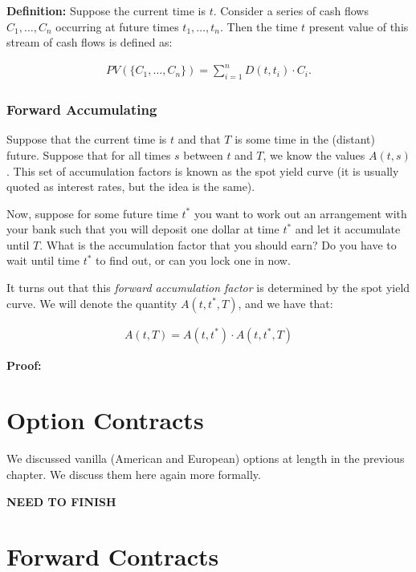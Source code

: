 \documentclass[11pt,]{krantz}
\begin{document}
\textbf{Definition:} Suppose the current time is \(t\). Consider a series of cash flows \(C_{1}, \ldots, C_{n}\) occurring at future times \(t_{1}, \ldots, t_{n}\). Then the time \(t\) present value of this stream of cash flows is defined as:

\begin{align*}
PV(\{ C_{1}, \ldots, C_{n} \}) = \sum_{i = 1}^{n} D(t, t_{i}) \cdot C_{i}.
\end{align*}

\subsubsection*{Forward Accumulating}\label{forward-accumulating}

Suppose that the current time is \(t\) and that \(T\) is some time in the (distant) future. Suppose that for all times \(s\) between \(t\) and \(T\), we know the values \(A(t,s)\). This set of accumulation factors is known as the spot yield curve (it is usually quoted as interest rates, but the idea is the same).

Now, suppose for some future time \(t^*\) you want to work out an arrangement with your bank such that you will deposit one dollar at time \(t^*\) and let it accumulate until \(T\). What is the accumulation factor that you should earn? Do you have to wait until time \(t^*\) to find out, or can you lock one in now.

It turns out that this \emph{forward accumulation factor} is determined by the spot yield curve. We will denote the quantity \(A(t, t^*, T)\), and we have that:

\begin{align*}
A(t, T) = A(t, t^*) \cdot A(t, t^*, T)
\end{align*}

\textbf{Proof:}

\section{Option Contracts}\label{option-contracts}

We discussed vanilla (American and European) options at length in the previous chapter. We discuss them here again more formally.

\textbf{NEED TO FINISH}

\section{Forward Contracts}\label{forward-contracts}
\end{document}
